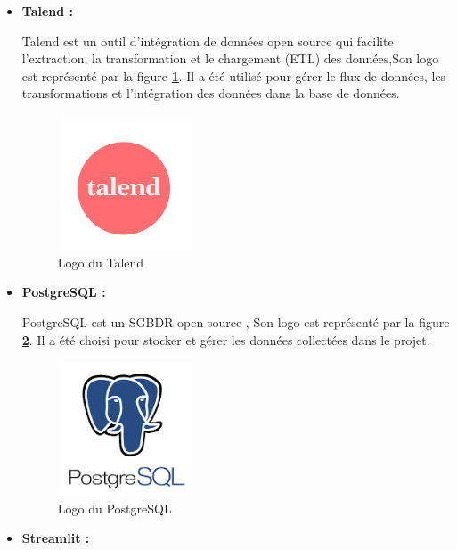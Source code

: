    \begin{itemize}
    \item \textbf{Talend : }
       \par Talend est un outil d'intégration de données open source qui facilite l'extraction, la transformation et le chargement (ETL) des données\cite{talend},Son logo est représenté par la figure \textbf{\ref{fig:talend}}. Il a été utilisé pour gérer le flux de données, les transformations et l'intégration des données dans la base de données. 
        \begin{figure}[H]
        \centering
        \includegraphics[width = 4cm , height=4cm]{img/techno/Talend.png}
        \caption{Logo du Talend\cite{talend}}
        \label{fig:talend}
        \end{figure}
    \item \textbf{PostgreSQL : }
    
       \par PostgreSQL est un SGBDR open source \cite{pq}, Son logo est représenté par la figure \textbf{\ref{fig:post}}. Il a été choisi pour stocker et gérer les données collectées dans le projet.
        \begin{figure}[H]
        \centering
        \includegraphics[width = 4cm , height=4cm]{img/techno/postgresql.png}
        \caption{Logo du PostgreSQL\cite{pg}}
        \label{fig:post}
        \end{figure}

    \item \textbf{Streamlit : }
     

\end{itemize}
